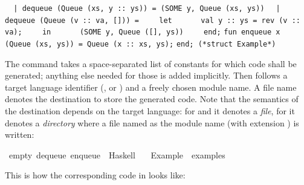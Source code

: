 \begin{isabellebody}
\begin{isamarkuptext}
\verb|  |\verb,|,\verb| dequeue (Queue (xs, y :: ys)) = (SOME y, Queue (xs, ys))|\newline%
\verb|  |\verb,|,\verb| dequeue (Queue (v :: va, [])) =|\newline%
\verb|    let|\newline%
\verb|      val y :: ys = rev (v :: va);|\newline%
\verb|    in|\newline%
\verb|      (SOME y, Queue ([], ys))|\newline%
\verb|    end;|\newline%
\newline%
\verb|fun enqueue x (Queue (xs, ys)) = Queue (x :: xs, ys);|\newline%
\newline%
\verb|end; (*struct Example*)|%
\end{isamarkuptext}%
\isamarkuptrue%
%
\endisatagquote
{\isafoldquote}%
%
\isadelimquote
%
\endisadelimquote
%
\begin{isamarkuptext}%
\noindent The \hyperlink{command.export-code}{\mbox{}} command takes a space-separated list of
  constants for which code shall be generated;  anything else needed for those
  is added implicitly.  Then follows a target language identifier
  (,  or ) and a freely chosen module name.
  A file name denotes the destination to store the generated code.  Note that
  the semantics of the destination depends on the target language:  for
   and  it denotes a \emph{file}, for 
  it denotes a \emph{directory} where a file named as the module name
  (with extension ) is written:%
\end{isamarkuptext}%
\isamarkuptrue%
%
\isadelimquote
%
\endisadelimquote
%
\isatagquote
{}\isamarkupfalse%
\ empty\ dequeue\ enqueue\ \ Haskell\isanewline
\ \ \ Example\ \ {\isachardoublequoteopen}examples{\isacharslash}{\isachardoublequoteclose}%
\endisatagquote
{\isafoldquote}%
%
\isadelimquote
%
\endisadelimquote
%
\begin{isamarkuptext}%
\noindent This is how the corresponding code in  looks like:%
\end{isamarkuptext}%
\isamarkuptrue%
%
\isadelimquote
%
\endisadelimquote
%
\isatagquote
%
\begin{isamarkuptext}%
\isaverbatim%
\noindent%

\end{isamarkuptext}
\end{isabellebody}
